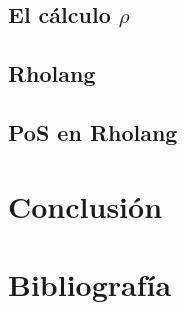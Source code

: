 \documentclass[14pt,letterpaper]{article}
\begin{document}
\subsection{El cálculo $\rho$}
\subsection{Rholang}
\subsection{PoS en Rholang}

\section{Conclusión}

\section{Bibliografía}

 
 
\end{document}

